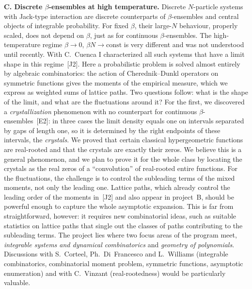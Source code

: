\documentclass[11pt,a4paper]{amsart}
\newcommand{\proj}[1]{\par\smallskip\noindent\textbf{#1}\;}
\begin{document}
\proj{C. Discrete $\beta$-ensembles at high temperature.}
Discrete $N$-particle systems with Jack-type interaction are discrete counterparts of $\beta$-ensembles and central objects of integrable probability. For fixed $\beta$, their large-$N$ behaviour, properly scaled, does not depend on $\beta$, just as for continuous $\beta$-ensembles. The high-temperature regime $\beta\to0$, $\beta N\to\mathrm{const}$ is very different and was not understood until recently. With C.~Cuenca I characterized all such systems that have a limit shape in this regime~[J2]. Here a probabilistic problem is solved almost entirely by algebraic combinatorics: the action of Cherednik--Dunkl operators on symmetric functions gives the moments of the empirical measure, which we express as weighted sums of lattice paths. Two questions follow: what is the shape of the limit, and what are the fluctuations around it? For the first, we discovered a \emph{crystallization} phenomenon with no counterpart for continuous $\beta$-ensembles~[E2]: in three cases the limit density equals one on intervals separated by gaps of length one, so it is determined by the right endpoints of these intervals, the \emph{crystals}. We proved that certain classical hypergeometric functions are real-rooted and that the crystals are exactly their zeros. We believe this is a general phenomenon, and we plan to prove it for the whole class by locating the crystals as the real zeros of a ``convolution'' of real-rooted entire functions. For the fluctuations, the challenge is to control the subleading terms of the mixed moments, not only the leading one. Lattice paths, which already control the leading order of the moments in~[J2] and also appear in project~B, should be powerful enough to capture the whole asymptotic expansion. This is far from straightforward, however: it requires new combinatorial ideas, such as suitable statistics on lattice paths that single out the classes of paths contributing to the subleading terms. The project lies where two focus areas of the program meet, \emph{integrable systems and dynamical combinatorics} and \emph{geometry of polynomials}. Discussions with S.~Corteel, Ph.~Di~Francesco and L.~Williams (integrable combinatorics, combinatorial moment problem, symmetric functions, asymptotic enumeration) and with C.~Vinzant (real-rootedness) would be particularly valuable.
 
\end{document}
